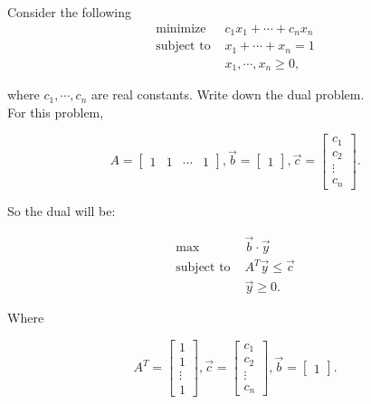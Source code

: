 \documentclass[12pt]{extarticle}
\theoremstyle{definition}
\begin{document}
\begin{problem} Consider the following
	 \begin{align*}
	\text{minimize } &c_1x_1+\cdots+c_nx_n\\
	\text{subject to } & x_1+\cdots+x_n=1\\
	&x_1,\cdots,x_n\geq 0,
	\end{align*}

	where $c_1,\cdots,c_n$ are real constants. Write down the dual problem.\\

	For this problem, 

		$$A=\begin{bmatrix}
		1&1&\cdots&1
		\end{bmatrix},\vec{b}=\begin{bmatrix}
		1
		\end{bmatrix},\vec{c}=\begin{bmatrix}
		c_1 \\ c_2 \\ \vdots \\ c_n
		\end{bmatrix}.$$

	So the dual will be:

		\begin{align*}
		\text{max } &\vec{b} \cdot \vec{y}\\
		\text{subject to } & A^T \vec{y} \leq \vec{c}\\
		&\vec{y}\geq 0.
		\end{align*}

	Where

		$$A^T=\begin{bmatrix}
		1\\1\\\vdots\\1
		\end{bmatrix},\vec{c}=\begin{bmatrix}
		c_1 \\ c_2 \\ \vdots \\ c_n
		\end{bmatrix},\vec{b}=\begin{bmatrix}
		1
		\end{bmatrix}.$$

\end{problem}
\end{document}
